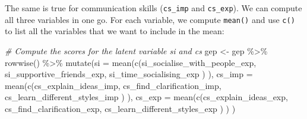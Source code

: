 \documentclass[
]{book}
\newenvironment{Shaded}{\begin{snugshade}}{\end{snugshade}}
\newcommand{\AttributeTok}[1]{\textcolor[rgb]{0.77,0.63,0.00}{#1}}
\newcommand{\CommentTok}[1]{\textcolor[rgb]{0.56,0.35,0.01}{\textit{#1}}}
\newcommand{\FunctionTok}[1]{\textcolor[rgb]{0.00,0.00,0.00}{#1}}
\newcommand{\NormalTok}[1]{#1}
\newcommand{\OtherTok}[1]{\textcolor[rgb]{0.56,0.35,0.01}{#1}}
\newcommand{\SpecialCharTok}[1]{\textcolor[rgb]{0.00,0.00,0.00}{#1}}
\begin{document}
The same is true for communication skills (\texttt{cs\_imp} and \texttt{cs\_exp}). We can compute all three variables in one go. For each variable, we compute \texttt{mean()} and use \texttt{c()} to list all the variables that we want to include in the mean:

\begin{Shaded}
\begin{Highlighting}[]
\CommentTok{\# Compute the scores for the latent variable \textquotesingle{}si\textquotesingle{} and \textquotesingle{}cs\textquotesingle{}}
\NormalTok{gep }\OtherTok{\textless{}{-}}\NormalTok{ gep }\SpecialCharTok{\%\textgreater{}\%}
  \FunctionTok{rowwise}\NormalTok{() }\SpecialCharTok{\%\textgreater{}\%}
  \FunctionTok{mutate}\NormalTok{(}\AttributeTok{si =} \FunctionTok{mean}\NormalTok{(}\FunctionTok{c}\NormalTok{(si\_socialise\_with\_people\_exp,}
\NormalTok{                     si\_supportive\_friends\_exp,}
\NormalTok{                     si\_time\_socialising\_exp}
\NormalTok{                     )}
\NormalTok{                   ),}
         \AttributeTok{cs\_imp =} \FunctionTok{mean}\NormalTok{(}\FunctionTok{c}\NormalTok{(cs\_explain\_ideas\_imp,}
\NormalTok{                         cs\_find\_clarification\_imp,}
\NormalTok{                         cs\_learn\_different\_styles\_imp}
\NormalTok{                         )}
\NormalTok{                       ),}
         \AttributeTok{cs\_exp =} \FunctionTok{mean}\NormalTok{(}\FunctionTok{c}\NormalTok{(cs\_explain\_ideas\_exp,}
\NormalTok{                         cs\_find\_clarification\_exp,}
\NormalTok{                         cs\_learn\_different\_styles\_exp}
\NormalTok{                         )}
\NormalTok{                       )}
\NormalTok{         )}


\end{Highlighting}
\end{Shaded}
\end{document}
